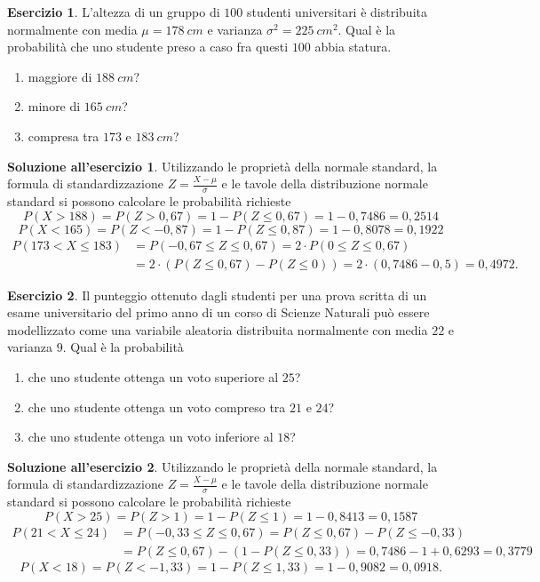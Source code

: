 \documentclass[12pt,a4paper]{article}
\theoremstyle{definition}
\newtheorem{sol}{Soluzione all'esercizio}
\newtheorem{exe}{Esercizio}
\begin{document}
\begin{exe}
	L'altezza di un gruppo di $ 100 $ studenti universitari è distribuita normalmente con media
	$ \mu = 178\ cm $ e varianza $ \sigma^2 = 225\ cm^2 $. Qual è la probabilità che uno studente preso a caso fra questi $ 100 $ abbia statura.
	\begin{enumerate}
		\item  maggiore di $ 188\ cm $?
		\item  minore di $ 165 \ cm $?
		\item  compresa tra $ 173 $ e $ 183\ cm $?
	\end{enumerate}
\end{exe}
\begin{sol}
	Utilizzando le proprietà della normale standard, la formula di standardizzazione $  Z = \frac{X - \mu}{\sigma} $ e le tavole della distribuzione normale standard si possono calcolare le probabilità richieste
	\[ P(X > 188) = P(Z > 0,67) = 1 - P(Z \le 0,67) = 1-0,7486 = 0,2514 \]
	\[ P(X < 165) = P(Z < -0,87) = 1 - P(Z \le 0,87) = 1 - 0,8078 = 0,1922 \]
	\[ \begin{split}
			P(173 < X \le 183) & = P(-0,67 \le Z \le 0,67) = 2\cdot P(0 \le Z \le 0,67)                             \\
			                   & =2\cdot \left( P(Z \le 0,67) - P(Z \le 0) \right) = 2\cdot(0,7486 - 0,5) = 0,4972.
		\end{split} \]
\end{sol}
\begin{exe}
	Il punteggio ottenuto dagli studenti per una prova scritta di un esame universitario del
	primo anno di un corso di Scienze Naturali può essere modellizzato come una variabile aleatoria distribuita	normalmente con media $ 22 $ e varianza $ 9 $. Qual è la probabilità
	\begin{enumerate}
		\item  che uno studente ottenga un voto superiore al $ 25 $?
		\item che uno studente ottenga un voto compreso tra $ 21 $ e $ 24 $?
		\item che uno studente ottenga un voto inferiore al $ 18 $?
	\end{enumerate}
\end{exe}
\begin{sol}
	Utilizzando le proprietà della normale standard, la formula di standardizzazione $  Z = \frac{X - \mu}{\sigma} $ e le tavole della distribuzione normale standard si possono calcolare le probabilità richieste
	\[ P(X > 25) = P(Z > 1) = 1 - P(Z \le1) = 1-0,8413 = 0,1587 \]
	\[ \begin{split}
			P(21 < X \le 24) & = P(-0,33 \le Z \le 0,67) =  P(Z \le 0,67) - P(Z \le -0,33)       \\
			                 & = P(Z \le 0,67) -(1 - P(Z \le 0,33)) = 0,7486 -1 +0,6293 = 0,3779
		\end{split} \]
	\[ P(X < 18) = P(Z < -1,33) = 1 - P(Z \le 1,33) = 1 - 0,9082 = 0,0918. \]
\end{sol}
\end{document}
